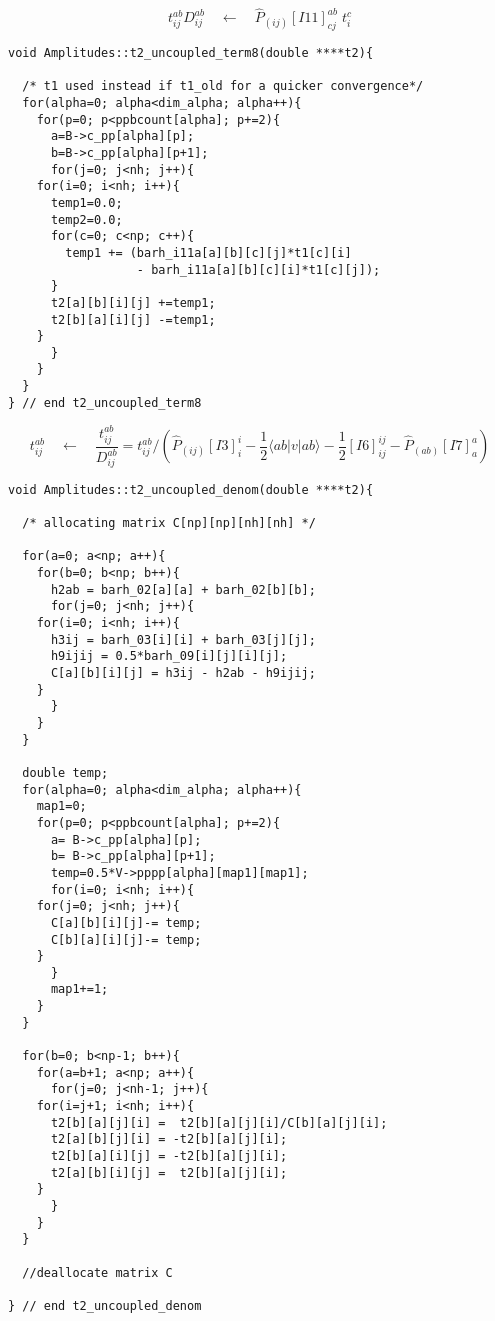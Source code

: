 \begin{equation*}
t_{ij}^{ab}D_{ij}^{ab}\quad \leftarrow \quad\hat{P}_{(ij)}[I11]_{cj}^{ab}\phantom{.}t_{i}^{c} 
\end{equation*}

\begin{lstlisting}[label={list:impl:t2term8},caption={implementation of the amp1 class function t2\_uncoupled\_term8()}]
void Amplitudes::t2_uncoupled_term8(double ****t2){
  
  /* t1 used instead if t1_old for a quicker convergence*/
  for(alpha=0; alpha<dim_alpha; alpha++){
    for(p=0; p<ppbcount[alpha]; p+=2){
      a=B->c_pp[alpha][p];
      b=B->c_pp[alpha][p+1];	  
      for(j=0; j<nh; j++){
	for(i=0; i<nh; i++){
	  temp1=0.0;
	  temp2=0.0;
	  for(c=0; c<np; c++){
	    temp1 += (barh_i11a[a][b][c][j]*t1[c][i] 
                  - barh_i11a[a][b][c][i]*t1[c][j]);
	  }
	  t2[a][b][i][j] +=temp1;
	  t2[b][a][i][j] -=temp1; 
	}
      }
    }
  }
} // end t2_uncoupled_term8
\end{lstlisting}

\begin{equation*}
t_{ij}^{ab}\quad \leftarrow \quad \frac{t_{ij}^{ab}}{D_{ij}^{ab}}=t_{ij}^{ab}/\left(\hat{P}_{(ij)}[I3]_{i}^{i}-\frac{1}{2}\langle ab|v|ab\rangle-\frac{1}{2}[I6]_{ij}^{ij}-\hat{P}_{(ab)}[I7]_{a}^{a}\right) 
\end{equation*}

\begin{lstlisting}[label={list:impl:t2denom},caption={implementation of the amp1 class function t2\_uncoupled\_denom()}]
void Amplitudes::t2_uncoupled_denom(double ****t2){

  /* allocating matrix C[np][np][nh][nh] */
    
  for(a=0; a<np; a++){
    for(b=0; b<np; b++){
      h2ab = barh_02[a][a] + barh_02[b][b];
      for(j=0; j<nh; j++){
	for(i=0; i<nh; i++){
	  h3ij = barh_03[i][i] + barh_03[j][j];
	  h9ijij = 0.5*barh_09[i][j][i][j];
	  C[a][b][i][j] = h3ij - h2ab - h9ijij;
	}
      }
    }
  }

  double temp;
  for(alpha=0; alpha<dim_alpha; alpha++){
    map1=0;
    for(p=0; p<ppbcount[alpha]; p+=2){
      a= B->c_pp[alpha][p];
      b= B->c_pp[alpha][p+1];
      temp=0.5*V->pppp[alpha][map1][map1];
      for(i=0; i<nh; i++){
	for(j=0; j<nh; j++){
	  C[a][b][i][j]-= temp;
	  C[b][a][i][j]-= temp;  
	}
      }
      map1+=1;
    }
  }
  
  for(b=0; b<np-1; b++){
    for(a=b+1; a<np; a++){
      for(j=0; j<nh-1; j++){
	for(i=j+1; i<nh; i++){
	  t2[b][a][j][i] =  t2[b][a][j][i]/C[b][a][j][i];
	  t2[a][b][j][i] = -t2[b][a][j][i];
	  t2[b][a][i][j] = -t2[b][a][j][i];
	  t2[a][b][i][j] =  t2[b][a][j][i];	  
	}
      }
    }
  }
  
  //deallocate matrix C
  
} // end t2_uncoupled_denom
\end{lstlisting}


